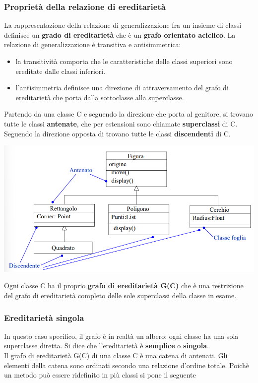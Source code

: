 \documentclass{article}
\begin{document}
	\subsubsection{Proprietà della relazione di ereditarietà}
	La rappresentazione della relazione di generalizzazione fra un insieme di classi definisce un \textbf{grado di ereditarietà} che è un \textbf{grafo orientato aciclico}. La relazione di generalizzazione è transitiva e antisimmetrica:
	\begin{itemize}
		\item la transitività comporta che le caratteristiche delle classi superiori sono ereditate dalle classi inferiori.
		\item l'antisimmetria definisce una direzione di attraversamento del grafo di ereditarietà che porta dalla sottoclasse alla superclasse.
	\end{itemize}
	Partendo da una classe C e seguendo la direzione che porta al genitore, si trovano tutte le classi \textbf{antenate}, che per estensioni sono chiamate \textbf{superclassi} di C. Seguendo la direzione opposta di trovano tutte le classi \textbf{discendenti} di C.
	\begin{center}
		\includegraphics[scale=0.5]{assets/ereditarieta_grafo.png}
	\end{center}
	Ogni classe C ha il proprio \textbf{grafo di ereditarietà G(C)} che è una restrizione del grafo di ereditarietà completo delle sole superclassi della classe in esame.

	\subsubsection{Ereditarietà singola}
	In questo caso specifico, il grafo è in realtà un albero: ogni classe ha una sola superclasse diretta. Si dice che l'ereditarietà è \textbf{semplice} o \textbf{singola}.
	\vspace{\baselineskip} \\
	Il grafo di ereditarietà G(C) di una classe C è una catena di antenati. Gli elementi della catena sono ordinati secondo una relazione d'ordine totale. Poichè un metodo può essere ridefinito in più classi si pone il seguente
\end{document}
